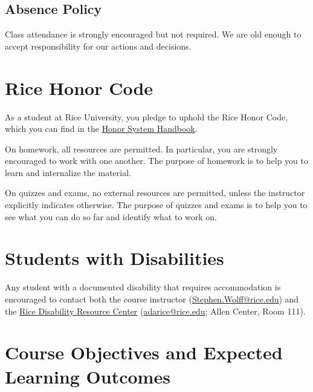 \subsection{Absence Policy}

Class attendance is strongly encouraged but not required. We are old enough to accept responsibility for our actions and decisions.





\section{Rice Honor Code}

As a student at Rice University, you pledge to uphold the Rice Honor Code, which you can find in the \href{http://honor.rice.edu/honor-system-handbook/}{Honor System Handbook}.

On homework, all resources are permitted. In particular, you are strongly encouraged to work with one another. The purpose of homework is to help you to learn and internalize the material.

On quizzes and exams, no external resources are permitted, unless the instructor explicitly indicates otherwise. The purpose of quizzes and exams is to help you to see what you can do so far and identify what to work on.





\section{Students with Disabilities}

Any student with a documented disability that requires accommodation is encouraged to contact both the course instructor (\href{mailto:Stephen.Wolff@rice.edu?subject=[Math\%20211]}{Stephen.Wolff@rice.edu}) and the \href{https://drc.rice.edu/}{Rice Disability Resource Center} (\href{mailto:adarice@rice.edu}{adarice@rice.edu}; Allen Center, Room 111).





%
%
%
%

\section{Course Objectives and Expected Learning Outcomes}

